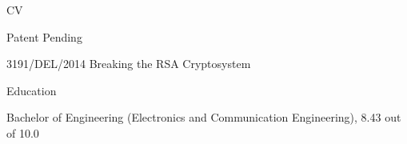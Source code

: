 \documentclass{scrartcl}
\begin{document}
\begin{cv}{CV}
\begin{cvlist}{Patent Pending}
\item 3191/DEL/2014 Breaking the RSA Cryptosystem
\end{cvlist}

\begin{cvlist}{Education}
\item Bachelor of Engineering (Electronics and Communication Engineering), 8.43 out of 10.0
\end{cvlist}
\end{cv}
\end{document}
